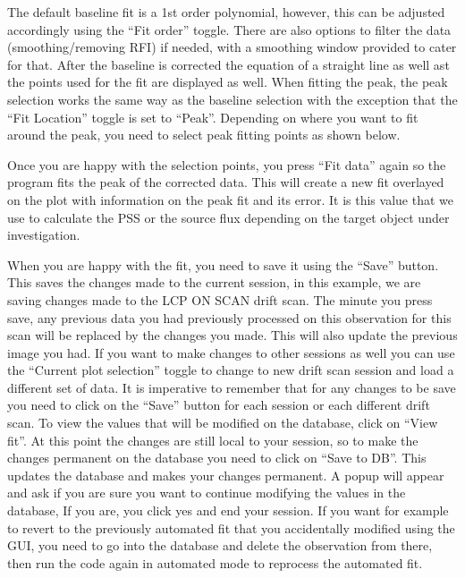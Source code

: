 \documentclass[letterpaper,10pt,english]{sphinxmanual}
\begin{document}
\noindent{}

\sphinxAtStartPar
The default baseline fit is a 1st order polynomial, however, this can be adjusted accordingly
using the “Fit order” toggle. There are also options to filter the data (smoothing/removing RFI)
if needed, with a smoothing window provided to cater for that. After the baseline is corrected
the equation of a straight line as well ast the points used for the fit are displayed
as well. When fitting the peak, the peak selection works the same way as the baseline
selection with the exception
that the “Fit Location” toggle is set to “Peak”. Depending on where you want to fit
around the peak, you need to select peak fitting points as shown below.

\noindent{}

\sphinxAtStartPar
Once you are happy with the selection points, you press “Fit data” again so the program
fits the peak of the corrected data. This will create a new fit overlayed on the plot
with information on the peak fit and its error. It is this value that we use to calculate
the PSS or the source flux depending on the target object under investigation.

\noindent{}

\sphinxAtStartPar
When you are happy with the fit, you need to save it using the “Save” button. This saves the
changes made to the current session, in this example, we are saving changes made to the
LCP ON SCAN drift scan. The minute you press save, any previous data you had previously
processed on this observation for this scan will be replaced by the changes you made.
This will also update the previous image you had. If you want to make changes to other
sessions as well you can use the “Current plot selection” toggle to change to new
drift scan session and load a different set of data. It is imperative to remember that
for any changes to be save you need to click on the “Save” button for each session or
each different drift scan. To view the values that will be modified
on the database, click on “View fit”. At this point the changes are still local to your
session, so to make the changes permanent on the database you need to click on “Save to
DB”. This updates the database and makes your changes permanent. A popup
will appear and ask if you are sure you want to continue modifying the values
in the database, If you are, you click yes and end your session. If you want
for example to revert to the previously automated fit that you accidentally
modified using the GUI, you need to go into the database and delete
the observation from there, then run the code again in automated mode to re\sphinxhyphen{}process
the automated fit.
\end{document}
